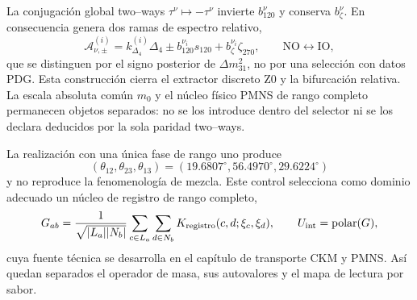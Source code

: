 La conjugación global two--ways
\(\tau^\nu\mapsto-\tau^\nu\) invierte
\(b_{120}^\nu\) y conserva \(b_\zeta^\nu\). En consecuencia genera dos
ramas de espectro relativo,
\begin{equation}
 \mathcal A_{\nu,\pm}^{(i)}
 =k_{\Delta_4}^{(i)}\Delta_4
  \pm b_{120}^{\nu_i}s_{120}
  +b_\zeta^{\nu_i}\zeta_{270},
 \qquad
 \text{NO}\longleftrightarrow\text{IO},
 \label{eq:bifurcacion-neutra-no-io-rev2}
\end{equation}
que se distinguen por el signo posterior de
\(\Delta m_{31}^2\), no por una selección con datos PDG. Esta construcción
cierra el extractor discreto Z0 y la bifurcación relativa. La escala absoluta
común \(m_0\) y el núcleo físico PMNS de rango completo permanecen objetos
separados: no se los introduce dentro del selector ni se los declara
deducidos por la sola paridad two--ways.

La realización con una única fase de rango uno produce
\[
 (\theta_{12},\theta_{23},\theta_{13})
 =(19.6807^\circ,56.4970^\circ,29.6224^\circ)
\]
y no reproduce la fenomenología de mezcla. Este control selecciona como dominio adecuado un
núcleo de registro de rango completo,
\begin{equation}
 G_{ab}=\frac1{\sqrt{|L_a||N_b|}}
 \sum_{c\in L_a}\sum_{d\in N_b}
 K_{\rm registro}(c,d;\xi_c,\xi_d),
 \qquad U_{\rm int}=\operatorname{polar}(G),
 \label{eq:kernel-registro-rango-completo-rev2}
\end{equation}
cuya fuente técnica se desarrolla en el capítulo de transporte CKM y
PMNS. Así quedan separados el operador de masa, sus autovalores y el mapa de
lectura por sabor.
